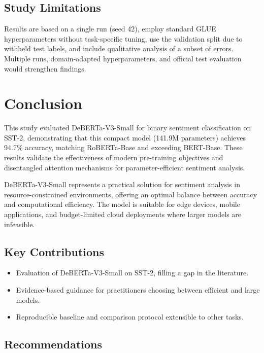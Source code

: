 \documentclass[pdflatex,sn-mathphys-num]{sn-jnl}
\theoremstyle{thmstyleone}%
\theoremstyle{thmstyletwo}%
\theoremstyle{thmstylethree}%
\begin{document}
\subsection{Study Limitations}

Results are based on a single run (seed 42), employ standard GLUE hyperparameters without task-specific tuning, use the validation split due to withheld test labels, and include qualitative analysis of a subset of errors. Multiple runs, domain-adapted hyperparameters, and official test evaluation would strengthen findings.



\section{Conclusion}\label{sec6}

This study evaluated DeBERTa-V3-Small for binary sentiment classification on SST-2, demonstrating that this compact model (141.9M parameters) achieves 94.7\% accuracy, matching RoBERTa-Base and exceeding BERT-Base. These results validate the effectiveness of modern pre-training objectives and disentangled attention mechanisms \cite{he2023debertav3} for parameter-efficient sentiment analysis.

DeBERTa-V3-Small represents a practical solution for sentiment analysis in resource-constrained environments, offering an optimal balance between accuracy and computational efficiency. The model is suitable for edge devices, mobile applications, and budget-limited cloud deployments where larger models are infeasible.

\subsection{Key Contributions}

\begin{itemize}
    \item Evaluation of DeBERTa-V3-Small on SST-2, filling a gap in the literature.
    \item Evidence-based guidance for practitioners choosing between efficient and large models.
    \item Reproducible baseline and comparison protocol extensible to other tasks.
\end{itemize}

\subsection{Recommendations}
\end{document}
